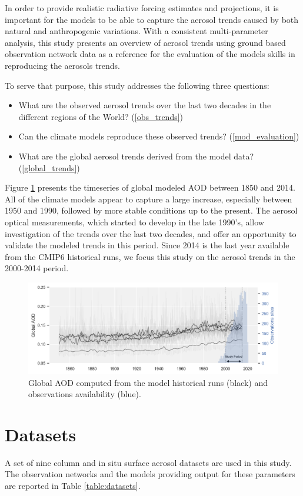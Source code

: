 \documentclass[journal abbreviation, manuscript]{copernicus}
\begin{document}
In order to provide realistic radiative forcing estimates and projections, it is important for the models to be able to capture the aerosol trends caused by both natural and anthropogenic variations. With a consistent multi-parameter analysis, this study presents an overview of aerosol trends using ground based observation network data as a reference for the evaluation of the models skills in reproducing the aerosols trends.

To serve that purpose, this study addresses the following three questions:
\begin{itemize}
    \item What are the observed aerosol trends over the last two decades in the different regions of the World? (\ref{obs_trends})
    \item Can the climate models reproduce these observed trends? (\ref{mod_evaluation})
    \item What are the global aerosol trends derived from the model data? (\ref{global_trends})
\end{itemize}

Figure \ref{fig:hist_runs} presents the timeseries of global modeled AOD between 1850 and 2014. All of the climate models appear to capture a large increase, especially between 1950 and 1990, followed by more stable conditions up to the present. The aerosol optical measurements, which started to develop in the late 1990's, allow investigation of the trends over the last two decades, and offer an opportunity to validate the modeled trends in this period. Since 2014 is the last year available from the CMIP6 historical runs, we focus this study on the aerosol trends in the 2000-2014 period.

\begin{figure}
 \centering
 \includegraphics[width=12cm]{../scripts/figs/hist_runs.png}
 \caption{Global AOD computed from the model historical runs (black) and observations availability (blue).}
 \label{fig:hist_runs}
\end{figure}


\section{Datasets}
A set of nine column and in situ surface aerosol datasets are used in this study. The observation networks and the models providing output for these parameters are reported in Table \ref{table:datasets}.
\end{document}
